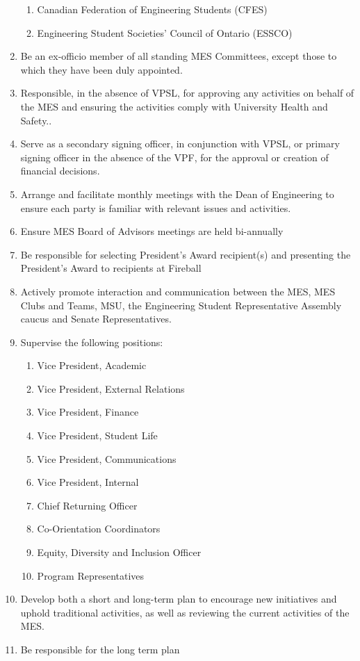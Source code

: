 \begin{enumerate}
  \begin{enumerate}
   \item
    Canadian Federation of Engineering Students (CFES)
   \item
    Engineering Student Societies' Council of Ontario (ESSCO)
  \end{enumerate}
 \item
  Be an ex-officio member of all standing MES Committees, except those to which they have been duly appointed.
 \item
  Responsible, in the absence of VPSL, for approving any activities on behalf of the MES and ensuring the activities comply with University Health and Safety..
 \item
  Serve as a secondary signing officer, in conjunction with VPSL, or primary signing officer in the absence of the VPF, for the approval or creation of financial decisions.
 \item
  Arrange and facilitate monthly meetings with the Dean of Engineering to ensure each party is familiar with relevant issues and activities.
 \item
  Ensure MES Board of Advisors meetings are held bi-annually
 \item
  Be responsible for selecting President's Award recipient(s) and presenting the President's Award to recipients at Fireball
 \item
  Actively promote interaction and communication between the MES, MES Clubs and Teams, MSU, the Engineering Student Representative Assembly caucus and Senate Representatives.
 \item
  Supervise the following positions:

  \begin{enumerate}
   \item
    Vice President, Academic
   \item
    Vice President, External Relations
   \item
    Vice President, Finance
   \item
    Vice President, Student Life
   \item
    Vice President, Communications
   \item
    Vice President, Internal
   \item
    Chief Returning Officer
   \item
    Co-Orientation Coordinators
   \item
    Equity, Diversity and Inclusion Officer
   \item
    Program Representatives
  \end{enumerate}
 \item
  Develop both a short and long-term plan to encourage new initiatives and uphold traditional activities, as well as reviewing the current activities of the MES.
 \item
  Be responsible for the long term plan


\end{enumerate}
